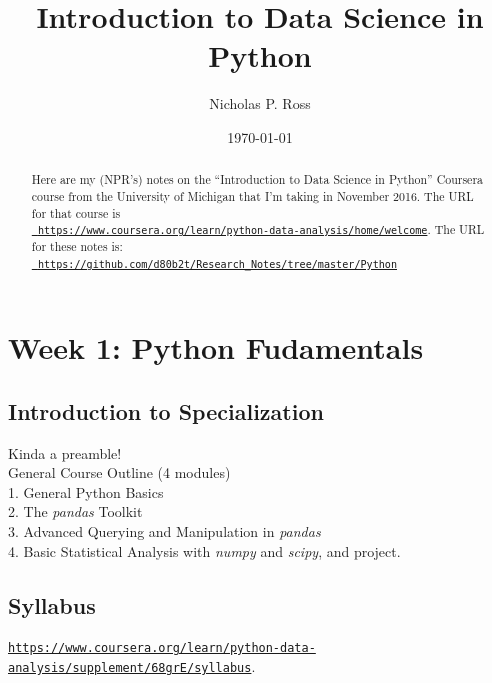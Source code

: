 \documentclass[11pt]{article}
\begin{document}
\title{Introduction to Data Science in Python}
\author{Nicholas P. Ross}
\date{\today}
\maketitle


\begin{abstract}
Here are my (NPR's) notes on the ``Introduction to Data Science in Python''
Coursera course from the University of Michigan that I'm taking in
November 2016.  The URL for that course is\\
\href{https://www.coursera.org/learn/python-data-analysis/home/welcome}{{\tt
https://www.coursera.org/learn/python-data-analysis/home/welcome}}.
The URL for these notes is:\\
\href{https://github.com/d80b2t/Research_Notes/tree/master/Python}{\tt
https://github.com/d80b2t/Research\_Notes/tree/master/Python}
\end{abstract}


\tableofcontents


\newpage
\section{Week 1: Python Fudamentals}

\subsection{Introduction to Specialization}
Kinda a preamble!\\
General Course Outline (4 modules) \\
1. General Python Basics \\
2. The {\it pandas} Toolkit \\
3. Advanced Querying and Manipulation in {\it pandas}\\
4. Basic Statistical Analysis with {\it numpy} and {\it scipy}, and project.\\

\subsection{Syllabus}
\href{https://www.coursera.org/learn/python-data-analysis/supplement/68grE/syllabus}{\tt https://www.coursera.org/learn/python-data-analysis/supplement/68grE/syllabus}. 
\end{document}
